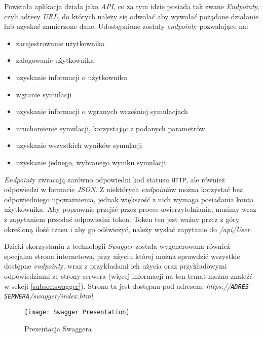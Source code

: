 \par Powstała aplikacja działa jako \emph{API}, co za tym idzie posiada tak zwane \emph{Endpoint}y, czyli adresy \emph{URL}, do których należy się odwołać aby wywołać pożądane działanie lub uzyskać zamierzone dane. Udostępnione zostały \emph{endpoint}y pozwalające na:
\begin{itemize}
	\item zarejestrowanie użytkownika
	\item zalogowanie użytkownika
	\item uzyskanie informacji o użytkowniku
	\item wgranie symulacji
	\item uzyskanie informacji o wgranych wcześniej symulacjach
	\item uruchomienie symulacji, korzystając z podanych parametrów
	\item uzyskanie wszystkich wyników symulacji
	\item uzyskanie jednego, wybranego wyniku symulacji.
\end{itemize}

\par \emph{Endpoint}y zwracają zarówno odpowiedni kod statusu \texttt{HTTP}, ale również odpowiedzi w formacie \emph{JSON}. Z niektórych \emph{endpoint}ów można korzystać bez odpowiedniego upoważnienia, jednak większość z nich wymaga posiadania konta użytkownika. Aby poprawnie przejść przez proces uwierzytelniania, musimy wraz z zapytaniem przesłać odpowiedni token. Token ten jest ważny przez z góry określoną ilość czasu i aby go odświeżyć, należy wysłać zapytanie do \emph{/api/User}.

\par Dzięki skorzystaniu z technologii \emph{Swagger} została wygenerowana również specjalna strona internetowa, przy użyciu której można sprawdzić wszystkie dostępne \emph{endpoint}y, wraz z przykładami ich użycia oraz przykładowymi odpowiedziami ze strony serwera (więcej informacji na ten temat można znaleźć w sekcji \ref{subsec:swagger}). Strona ta jest dostępna pod adresem: \emph{https://\texttt{ADRES SERWERA}/swagger/index.html}.

\begin{figure}[H]
	\texttt{[image: Swagger Presentation]}
	\caption{Prezentacja Swaggera}
\end{figure}

